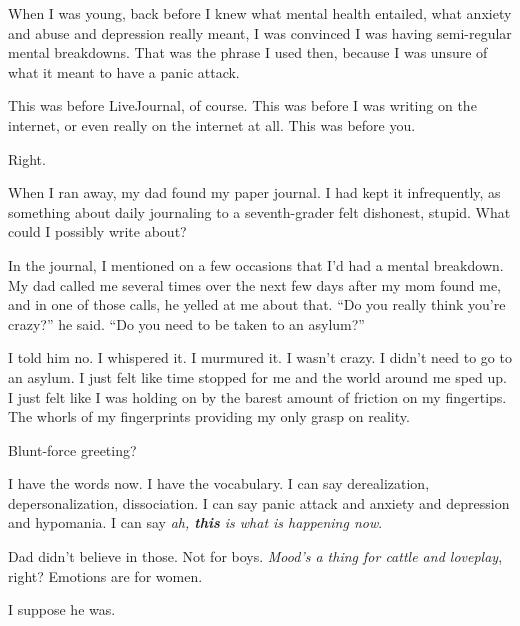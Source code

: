 When I was young, back before I knew what mental health entailed, what anxiety and abuse and depression really meant, I was convinced I was having semi-regular mental breakdowns. That was the phrase I used then, because I was unsure of what it meant to have a panic attack.

This was before LiveJournal, of course. This was before I was writing on the internet, or even really on the internet at all. This was before you.


Right.

When I ran away, my dad found my paper journal. I had kept it infrequently, as something about daily journaling to a seventh-grader felt dishonest, stupid. What could I possibly write about?

In the journal, I mentioned on a few occasions that I'd had a mental breakdown. My dad called me several times over the next few days after my mom found me, and in one of those calls, he yelled at me about that. ``Do you really think you're crazy?'' he said. ``Do you need to be taken to an asylum?''

I told him no. I whispered it. I murmured it. I wasn't crazy. I didn't need to go to an asylum. I just felt like time stopped for me and the world around me sped up. I just felt like I was holding on by the barest amount of friction on my fingertips. The whorls of my fingerprints providing my only grasp on reality.


Blunt-force greeting?


I have the words now. I have the vocabulary. I can say derealization, depersonalization, dissociation. I can say panic attack and anxiety and depression and hypomania. I can say \emph{ah, \textbf{this} is what is happening now}.


Dad didn't believe in those. Not for boys. \emph{Mood's a thing for cattle and loveplay}, right? Emotions are for women.


I suppose he was.

\newpage
